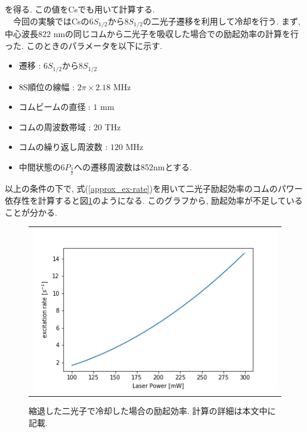 \documentclass[uplatex, dvipdfmx, a4paper, report, papersize, 11pt]{jsbook}
\begin{document}
を得る. この値をCsでも用いて計算する. \\
　今回の実験ではCsの$6S_{1/2}$から$8S_{1/2}$の二光子遷移を利用して冷却を行う. まず, 中心波長$822$ nmの同じコムから二光子を吸収した場合での励起効率の計算を行った. このときのパラメータを以下に示す.
\begin{itemize}
  \item 遷移 : $6S_{1/2}$から$8S_{1/2}$
  \item 8S順位の線幅 : $2\pi \times 2.18$ MHz
  \item コムビームの直径 : $1$ mm
  \item コムの周波数帯域 : $20$ THz
  \item コムの繰り返し周波数 : $120$ MHz
  \item 中間状態の$6P_{\frac{3}{2}}$への遷移周波数は852nmとする.
\end{itemize}
以上の条件の下で, 式(\ref{approx_ex-rate})を用いて二光子励起効率のコムのパワー依存性を計算すると図\ref{degenerated_2_photon_excitation_rate-P}のようになる. このグラフから, 励起効率が不足していることが分かる. \\
\begin{figure}[htpb]
  \centering
    \begin{tabular}{c}
      \begin{minipage}{1\hsize}
        \centering
          \includegraphics[keepaspectratio,  scale=0.6,  angle=0]
                          {figures/chapter3/degenerated_2_photon_excitation_rate-P.png}
                          \caption{縮退した二光子で冷却した場合の励起効率. 計算の詳細は本文中に記載. }
                          \label{degenerated_2_photon_excitation_rate-P}
      \end{minipage}
    \end{tabular}
\end{figure}
\end{document}
